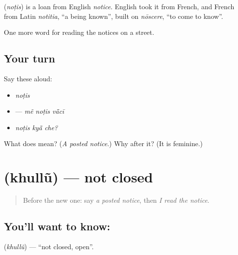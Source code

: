 \begin{cousinweb}
\textbf{} (\emph{noṭis}) is a loan from English \emph{notice}. English took it from French, and French from Latin \emph{notitia}, \textquotedblleft{}a being known\textquotedblright{}, built on \emph{nōscere}, \textquotedblleft{}to come to know\textquotedblright{}.
\end{cousinweb}

\begin{grammarlens}[title={What you've built}]
One more word for reading the notices on a street.
\end{grammarlens}

\subsection*{Your turn}
Say these aloud:

\begin{itemize}
\raggedright
  \item \emph{noṭis}
  \item \textbf{  } — \emph{mẽ noṭis vā̃cī}
  \item \emph{noṭis kyā̃ che?}
\end{itemize}

\begin{tcolorbox}[breakable,colback=teal!4,colframe=teal!35!black,title={Before you move on}]
What does \textbf{} mean? (\emph{A posted notice}.) Why \textbf{} after it? (It is feminine.)
\end{tcolorbox}
\section[\texorpdfstring{\gu{ખુલ્લું} (khullũ)}{ખુલ્લું (khullũ)}]{ (khullũ) — not closed}

\label{lesson:GU-C151-khullun}



\begin{quote}
Before the new one: say \emph{a posted notice}, then \emph{I read the notice}.
\end{quote}

\subsection*{You'll want to know: }
\textbf{} (\emph{khullũ}) — \textquotedblleft{}not closed, open\textquotedblright{}.

